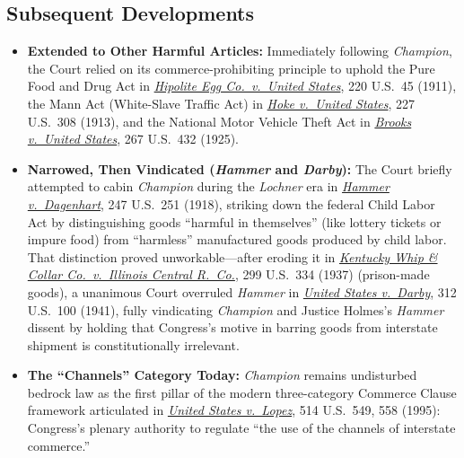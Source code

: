 \documentclass[12pt]{article}
\begin{document}
\subsection{Subsequent Developments}

\begin{itemize}

\item \textbf{Extended to Other Harmful Articles:} Immediately following \textit{Champion}, the Court relied on its commerce-prohibiting principle to uphold the Pure Food and Drug Act in \href{https://supreme.justia.com/cases/federal/us/220/45/}{\textit{Hipolite Egg Co.\ v.\ United States}}, 220 U.S.\ 45 (1911), the Mann Act (White-Slave Traffic Act) in \href{https://supreme.justia.com/cases/federal/us/227/308/}{\textit{Hoke v.\ United States}}, 227 U.S.\ 308 (1913), and the National Motor Vehicle Theft Act in \href{https://supreme.justia.com/cases/federal/us/267/432/}{\textit{Brooks v.\ United States}}, 267 U.S.\ 432 (1925).

\item \textbf{Narrowed, Then Vindicated (\textit{Hammer} and \textit{Darby}):} The Court briefly attempted to cabin \textit{Champion} during the \textit{Lochner} era in \href{https://supreme.justia.com/cases/federal/us/247/251/}{\textit{Hammer v.\ Dagenhart}}, 247 U.S.\ 251 (1918), striking down the federal Child Labor Act by distinguishing goods ``harmful in themselves'' (like lottery tickets or impure food) from ``harmless'' manufactured goods produced by child labor. That distinction proved unworkable---after eroding it in \href{https://supreme.justia.com/cases/federal/us/299/334/}{\textit{Kentucky Whip \& Collar Co.\ v.\ Illinois Central R.\ Co.}}, 299 U.S.\ 334 (1937) (prison-made goods), a unanimous Court overruled \textit{Hammer} in \href{https://supreme.justia.com/cases/federal/us/312/100/}{\textit{United States v.\ Darby}}, 312 U.S.\ 100 (1941), fully vindicating \textit{Champion} and Justice Holmes's \textit{Hammer} dissent by holding that Congress's motive in barring goods from interstate shipment is constitutionally irrelevant.

\item \textbf{The ``Channels'' Category Today:} \textit{Champion} remains undisturbed bedrock law as the first pillar of the modern three-category Commerce Clause framework articulated in \href{https://supreme.justia.com/cases/federal/us/514/549/}{\textit{United States v.\ Lopez}}, 514 U.S.\ 549, 558 (1995): Congress's plenary authority to regulate ``the use of the channels of interstate commerce.''

\end{itemize}
\end{document}
